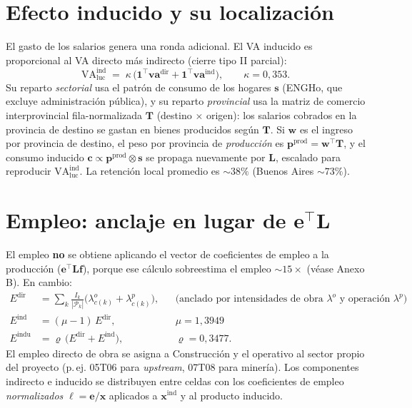 \documentclass[11pt]{article}
\begin{document}
\section{Efecto inducido y su localización}
El gasto de los salarios genera una ronda adicional. El VA inducido es proporcional al VA directo más indirecto (cierre tipo II parcial):
\begin{equation}
\mathrm{VA}^{\text{ind}}_{\text{luc}} \;=\; \kappa \,\big(\mathbf{1}^{\!\top}\mathbf{va}^{\text{dir}}+\mathbf{1}^{\!\top}\mathbf{va}^{\text{ind}}\big),\qquad \kappa=0{,}353.
\end{equation}
Su reparto \emph{sectorial} usa el patrón de consumo de los hogares $\mathbf{s}$ (ENGHo, que excluye administración pública), y su reparto \emph{provincial} usa la matriz de comercio interprovincial fila-normalizada $\mathbf{T}$ (destino $\times$ origen): los salarios cobrados en la provincia de destino se gastan en bienes producidos según $\mathbf{T}$. Si $\mathbf{w}$ es el ingreso por provincia de destino, el peso por provincia de \emph{producción} es $\mathbf{p}^{\text{prod}}=\mathbf{w}^{\!\top}\mathbf{T}$, y el consumo inducido $\mathbf{c}\propto \mathbf{p}^{\text{prod}}\otimes\mathbf{s}$ se propaga nuevamente por $\mathbf{L}$, escalado para reproducir $\mathrm{VA}^{\text{ind}}_{\text{luc}}$. La retención local promedio es $\sim\!38\%$ (Buenos Aires $\sim\!73\%$).

\section{Empleo: anclaje en lugar de \texorpdfstring{$\mathbf{e}^{\top}\mathbf{L}$}{e'L}}
El empleo \textbf{no} se obtiene aplicando el vector de coeficientes de empleo a la producción ($\mathbf{e}^{\top}\mathbf{L}\mathbf{f}$), porque ese cálculo sobreestima el empleo $\sim\!15\times$ (véase Anexo B). En cambio:
\begin{align}
E^{\text{dir}} &= \sum_k \frac{I_k}{|\mathcal{P}_k|}\big(\lambda^{o}_{c(k)}+\lambda^{p}_{c(k)}\big), &&\text{(anclado por intensidades de obra $\lambda^o$ y operación $\lambda^p$)}\\
E^{\text{ind}} &= (\mu-1)\,E^{\text{dir}}, && \mu=1{,}3949\\
E^{\text{indu}} &= \varrho\,\big(E^{\text{dir}}+E^{\text{ind}}\big), && \varrho=0{,}3477.
\end{align}
El empleo directo de obra se asigna a Construcción y el operativo al sector propio del proyecto (p.\,ej. 05T06 para \emph{upstream}, 07T08 para minería). Los componentes indirecto e inducido se distribuyen entre celdas con los coeficientes de empleo \emph{normalizados} $\boldsymbol{\ell}=\mathbf{e}/\mathbf{x}$ aplicados a $\mathbf{x}^{\text{ind}}$ y al producto inducido.
\end{document}
